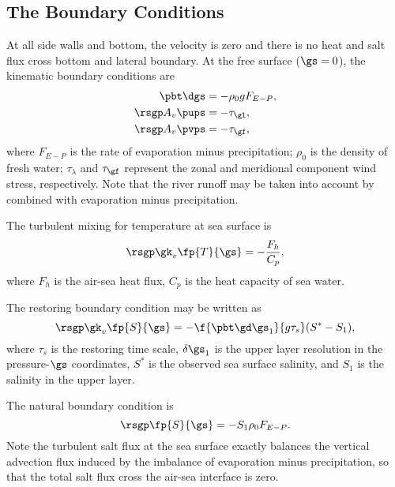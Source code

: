 
\subsection{The Boundary Conditions}

At all side walls and bottom, the velocity is zero and there is no
heat and salt flux cross bottom and lateral boundary. At the free
surface ($\gs=0$), the kinematic boundary conditions are
\begin{align} \label{eq:27}
  \pbt\dgs &= -\rho_{0}gF_{E-P},\\
  \rsgp A_{v}\pups &= -\tau_{\gl},\\
  \rsgp A_{v}\pvps &= -\tau_{\gf},
\end{align}
 where $F_{E-P}$ is the rate of evaporation minus precipitation;
$\rho_{0}$ is the density of fresh water; $\tau_{\lambda}$ and $\tau_{\gf}$
represent the zonal and meridional component wind stress, respectively.
Note that the river runoff may be taken into account by combined with
evaporation minus precipitation.

The turbulent mixing for temperature at sea surface is 
\begin{equation}
  \rsgp \gk_{v} \fp{T}{\gs} = -\frac{F_{h}}{C_{p}},
\end{equation}
where $F_{h}$ is the air-sea heat flux, $C_{p}$ is the heat capacity
of sea water.

The restoring boundary condition may be written as
\begin{equation}
\rsgp \gk_{v} \fp{S}{\gs} = -\f{\pbt\gd\gs_{1}}{g\tau_{s}}(S^{*}-S_{1}),
\end{equation}
 where $\tau_{s}$ is the restoring time scale, $\delta\gs_{1}$
is the upper layer resolution in the pressure-$\gs$ coordinates,
$S^{*}$ is the observed sea surface salinity, and $S_{1}$ is the
salinity in the upper layer.

The natural boundary condition \citep{Huang1993} is
\begin{equation}
\rsgp\fp{S}{\gs}=-S_{1}\rho_{0}F_{E-P}.
\end{equation}
 Note the turbulent salt flux at the sea surface exactly balances
the vertical advection flux induced by the imbalance of evaporation
minus precipitation, so that the total salt flux cross the air-sea
interface is zero.
